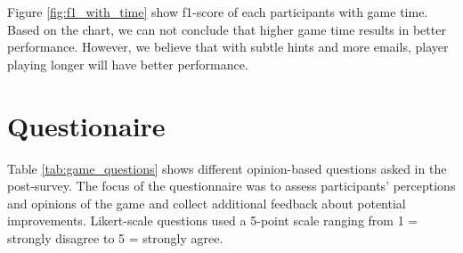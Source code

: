 Figure \ref{fig:f1_with_time} show f1-score of each participants with game time. Based on the chart, we can not conclude that higher game time results in better performance. However, we believe that with subtle hints and more emails, player playing longer will have better performance.

\section{Questionaire}
Table \ref{tab:game_questions} shows different opinion-based questions asked in the post-survey. The focus of the questionnaire was to assess participants' perceptions and opinions of the game and collect additional feedback about potential improvements.  Likert-scale questions used a 5-point scale ranging from 1 = strongly disagree to 5 = strongly agree.

